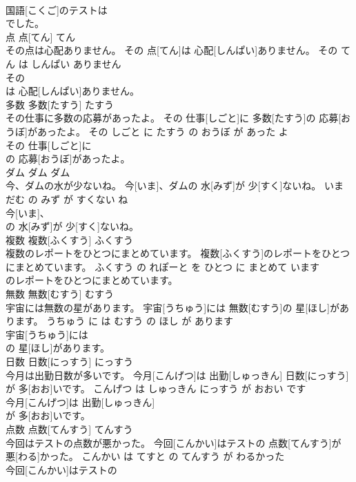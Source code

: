 \documentclass[8pt]{extreport}
\begin{document}
\begin{CJK}{UTF8}{min}
\\	国語[こくご]のテストは
\\	でした。			
\\	点	点[てん]	てん	
\\	その点は心配ありません。	その 点[てん]は 心配[しんぱい]ありません。	その てん は しんぱい ありません	
\\	その
\\	は 心配[しんぱい]ありません。			
\\	多数	多数[たすう]	たすう	
\\	その仕事に多数の応募があったよ。	その 仕事[しごと]に 多数[たすう]の 応募[おうぼ]があったよ。	その しごと に たすう の おうぼ が あった よ	
\\	その 仕事[しごと]に
\\	の 応募[おうぼ]があったよ。			
\\	ダム	ダム	ダム	
\\	今、ダムの水が少ないね。	今[いま]、ダムの 水[みず]が 少[すく]ないね。	いま だむ の みず が すくない ね	
\\	今[いま]、
\\	の 水[みず]が 少[すく]ないね。			
\\	複数	複数[ふくすう]	ふくすう	
\\	複数のレポートをひとつにまとめています。	複数[ふくすう]のレポートをひとつにまとめています。	ふくすう の れぽーと を ひとつ に まとめて います	
\\	のレポートをひとつにまとめています。			
\\	無数	無数[むすう]	むすう	
\\	宇宙には無数の星があります。	宇宙[うちゅう]には 無数[むすう]の 星[ほし]があります。	うちゅう に は むすう の ほし が あります	
\\	宇宙[うちゅう]には
\\	の 星[ほし]があります。			
\\	日数	日数[にっすう]	にっすう	
\\	今月は出勤日数が多いです。	今月[こんげつ]は 出勤[しゅっきん] 日数[にっすう]が 多[おお]いです。	こんげつ は しゅっきん にっすう が おおい です	
\\	今月[こんげつ]は 出勤[しゅっきん]
\\	が 多[おお]いです。			
\\	点数	点数[てんすう]	てんすう	
\\	今回はテストの点数が悪かった。	今回[こんかい]はテストの 点数[てんすう]が 悪[わる]かった。	こんかい は てすと の てんすう が わるかった	
\\	今回[こんかい]はテストの

\end{CJK}
\end{document}
